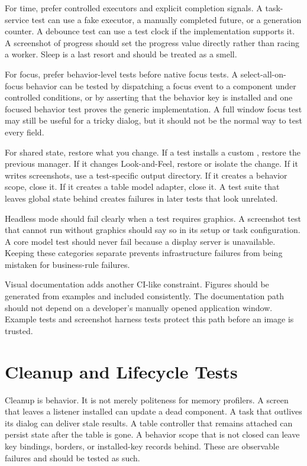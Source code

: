 For time, prefer controlled executors and explicit completion signals. A task-service test can use a fake executor, a manually completed future, or a generation counter. A debounce test can use a test clock if the implementation supports it. A screenshot of progress should set the progress value directly rather than racing a worker. Sleep is a last resort and should be treated as a smell.

For focus, prefer behavior-level tests before native focus tests. A select-all-on-focus behavior can be tested by dispatching a focus event to a component under controlled conditions, or by asserting that the behavior key is installed and one focused behavior test proves the generic implementation. A full window focus test may still be useful for a tricky dialog, but it should not be the normal way to test every field.

For shared state, restore what you change. If a test installs a custom , restore the previous manager. If it changes Look-and-Feel, restore or isolate the change. If it writes screenshots, use a test-specific output directory. If it creates a behavior scope, close it. If it creates a table model adapter, close it. A test suite that leaves global state behind creates failures in later tests that look unrelated.

Headless mode should fail clearly when a test requires graphics. A screenshot test that cannot run without graphics should say so in its setup or task configuration. A core model test should never fail because a display server is unavailable. Keeping these categories separate prevents infrastructure failures from being mistaken for business-rule failures.

Visual documentation adds another CI-like constraint. Figures should be generated from examples and included consistently. The documentation path should not depend on a developer's manually opened application window. Example tests and screenshot harness tests protect this path before an image is trusted.

\section{Cleanup and Lifecycle Tests}

Cleanup is behavior. It is not merely politeness for memory profilers. A screen that leaves a listener installed can update a dead component. A task that outlives its dialog can deliver stale results. A table controller that remains attached can persist state after the table is gone. A behavior scope that is not closed can leave key bindings, borders, or installed-key records behind. These are observable failures and should be tested as such.

